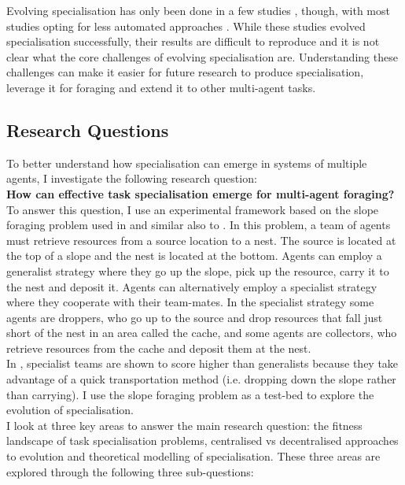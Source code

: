 \documentclass[12pt]{article}
\begin{document}
Evolving specialisation has only been done in a few studies \cite{ferrante:PLOS_CB:2015, nitschke:SEC:2012}, though, with most studies opting for less automated approaches \cite{hamann:Springer:2018}.
While these studies evolved specialisation successfully, their results are difficult to reproduce and it is not clear what the core challenges of evolving specialisation are.
Understanding these challenges can make it easier for future research to produce specialisation, leverage it for foraging and extend it to other multi-agent tasks.

\subsection{Research Questions}

To better understand how specialisation can emerge in systems of multiple agents, I investigate the following research question:\\

\textbf{How can effective task specialisation emerge for multi-agent foraging?}\\

To answer this question, I use an experimental framework based on the slope foraging problem used in \cite{ferrante:PLOS_CB:2015} and similar also to \cite{pini:ICSI:2012, pini:SI:2011}.
In this problem, a team of agents must retrieve resources from a source location to a nest.
The source is located at the top of a slope and the nest is located at the bottom.
Agents can employ a generalist strategy where they go up the slope, pick up the resource, carry it to the nest and deposit it.
Agents can alternatively employ a specialist strategy where they cooperate with their team-mates.
In the specialist strategy some agents are droppers, who go up to the source and drop resources that fall just short of the nest in an area called the cache, and some agents are collectors, who retrieve resources from the cache and deposit them at the nest.\\

In \cite{pini:ICSI:2012, pini:SI:2011,ferrante:PLOS_CB:2015}, specialist teams are shown to score higher than generalists because they take advantage of a quick transportation method (i.e. dropping down the slope rather than carrying).
I use the slope foraging problem as a test-bed to explore the evolution of specialisation.\\

I look at three key areas to answer the main research question: the fitness landscape of task specialisation problems, centralised vs decentralised approaches to evolution and theoretical modelling of specialisation.
These three areas are explored through the following three sub-questions:\\
\end{document}

